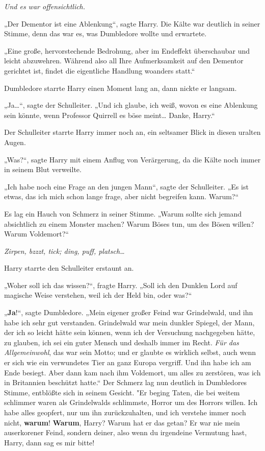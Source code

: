 {\emph{Und es war offensichtlich.}

„Der Dementor ist eine Ablenkung“, sagte Harry. Die Kälte war deutlich in seiner Stimme, denn das war es, was Dumbledore wollte und erwartete.

„Eine große, hervorstechende Bedrohung, aber im Endeffekt überschaubar und leicht abzuwehren. Während also all Ihre Aufmerksamkeit auf den Dementor gerichtet ist, findet die eigentliche Handlung woanders statt.“

Dumbledore starrte Harry einen Moment lang an, dann nickte er langsam.

„Ja…“, sagte der Schulleiter. „Und ich glaube, ich weiß, wovon es eine Ablenkung sein könnte, wenn Professor Quirrell es böse meint… Danke, Harry.“

Der Schulleiter starrte Harry immer noch an, ein seltsamer Blick in diesen uralten Augen.

„Was?“, sagte Harry mit einem Anflug von Verärgerung, da die Kälte noch immer in seinem Blut verweilte.

„Ich habe noch eine Frage an den jungen Mann“, sagte der Schulleiter. „Es ist etwas, das ich mich schon lange frage, aber nicht begreifen kann. Warum?“

Es lag ein Hauch von Schmerz in seiner Stimme. „Warum sollte sich jemand absichtlich zu einem Monster machen? Warum Böses tun, um des Bösen willen? Warum Voldemort?“

\emph{Zirpen, bzzzt, tick; ding, puff, platsch…}

Harry starrte den Schulleiter erstaunt an.

„Woher soll ich das wissen?“, fragte Harry. „Soll ich den Dunklen Lord auf magische Weise verstehen, weil ich der Held bin, oder was?“

„\textbf{Ja}!“, sagte Dumbledore. „Mein eigener großer Feind war Grindelwald, und ihn habe ich sehr gut verstanden. Grindelwald war mein dunkler Spiegel, der Mann, der ich so leicht hätte sein können, wenn ich der Versuchung nachgegeben hätte, zu glauben, ich sei ein guter Mensch und deshalb immer im Recht. \emph{Für das Allgemeinwohl}, das war sein Motto; und er glaubte es wirklich selbst, auch wenn er sich wie ein verwundetes Tier an ganz Europa vergriff. Und ihn habe ich am Ende besiegt. Aber dann kam nach ihm Voldemort, um alles zu zerstören, was ich in Britannien beschützt hatte.“ Der Schmerz lag nun deutlich in Dumbledores Stimme, entblößte sich in seinem Gesicht. "Er beging Taten, die bei weitem schlimmer waren als Grindelwalds schlimmste, Horror um des Horrors willen. Ich habe alles geopfert, nur um ihn zurückzuhalten, und ich verstehe immer noch nicht, \textbf{warum}! \textbf{Warum}, Harry? Warum hat er das getan? Er war nie mein auserkorener Feind, sondern deiner, also wenn du irgendeine Vermutung hast, Harry, dann sag es mir bitte!

}
